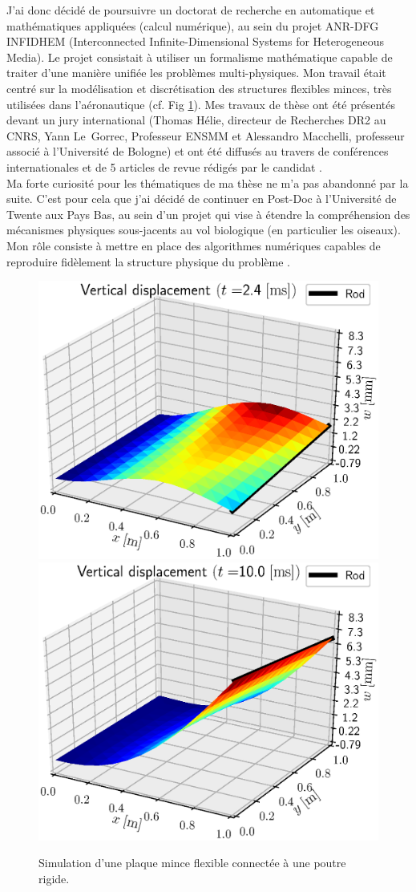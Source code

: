 \documentclass[french]{article}
\begin{document}
J'ai donc décidé de poursuivre un doctorat de recherche en automatique et mathématiques appliquées (calcul numérique), au sein du projet ANR-DFG INFIDHEM (Interconnected Infinite-Dimensional Systems for Heterogeneous Media). Le projet consistait \`a utiliser un formalisme mathématique capable de traiter d'une manière unifiée les problèmes multi-physiques. Mon travail était centré sur la modélisation et discrétisation des structures flexibles minces, très utilisées dans l'aéronautique (cf. Fig \ref{fig:IntRod}). Mes travaux de thèse ont été présentés devant un jury international (Thomas Hélie, directeur de Recherches DR2 au CNRS, Yann Le~Gorrec, Professeur ENSMM et Alessandro Macchelli, professeur associé \`a l'Universit\'e de Bologne) et ont été diffusés au travers de conférences internationales et de 5 articles de revue rédigés par le candidat \cite{brugnoli2019ammmin,brugnoli2019ammkir,brugnoli2020msd,brugnoli2021ther,brugnoli2021num}. \\

Ma forte curiosit\'e pour les thématiques de ma thèse ne m'a pas abandonné par la suite. C'est pour cela que j'ai décidé de continuer en Post-Doc \`a l'Universit\'e de Twente aux Pays Bas, au sein d'un projet qui vise \`a étendre la compréhension des mécanismes physiques sous-jacents au vol biologique (en particulier les oiseaux). Mon rôle consiste \`a mettre en place des algorithmes numériques capables de reproduire fidèlement la structure physique du problème \cite{califano2021}.

\begin{figure}[h]
	\includegraphics[width=0.5\linewidth]{SnapRod_t25.eps}
	\includegraphics[width=0.5\linewidth]{SnapRod_t100.eps}
	\caption{Simulation d'une plaque mince flexible connectée \`a une poutre rigide.}
	\label{fig:IntRod}
\end{figure}
\end{document}
